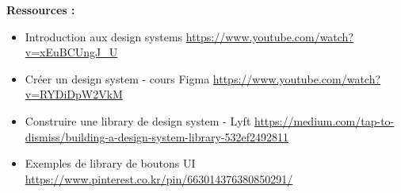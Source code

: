 \textbf{Ressources :}

\begin{itemize}
\item Introduction aux design systems \url{https://www.youtube.com/watch?v=xEuBCUngJ_U}
\item Créer un design system - cours Figma \url{https://www.youtube.com/watch?v=RYDiDpW2VkM}
\item Construire une library de design system - Lyft \url{https://medium.com/tap-to-dismiss/building-a-design-system-library-532ef2492811}
\item Exemples de library de boutons UI \url{https://www.pinterest.co.kr/pin/663014376380850291/}
\end{itemize}

